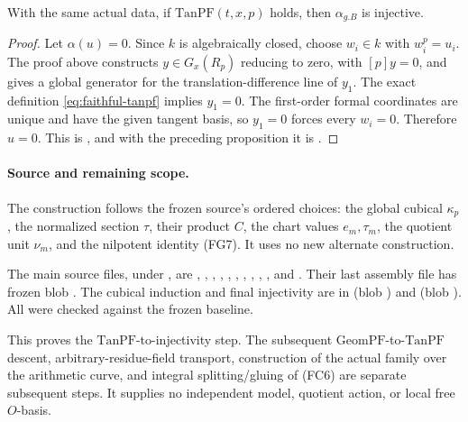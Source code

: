 \begin{srcorollary}\label{cor:faithful-tanpf-injectivity}
With the same actual data, if
\(\mathrm{TanPF}(t,x,p)\) holds, then
\(\alpha_{g.B}\) is injective.
\end{srcorollary}
\begin{proof}
Let \(\alpha(u)=0\).
Since \(k\) is algebraically closed, choose \(w_i\in k\)
with \(w_i^p=u_i\).
The proof above constructs \(y\in G_x(R_p)\) reducing to
zero, with \([p]y=0\), and gives a global generator for
the translation-difference line of \(y_1\).
The exact definition \eqref{eq:faithful-tanpf} implies
\(y_1=0\).
The first-order formal coordinates are unique and have
the given tangent basis, so \(y_1=0\) forces every \(w_i=0\).
Therefore \(u=0\).
This is , and
with the preceding proposition it is
.
\end{proof}

\paragraph{Source and remaining scope.}
The construction follows the frozen source's ordered
choices: the global cubical \(\kappa_p\), the normalized
section \(\tau\), their product \(C\), the chart values
\(e_m,\tau_m\), the quotient unit \(\nu_m\), and the
nilpotent identity (FG7).
It uses no new alternate construction.

The main source files, under
,
are ,
,
,
,
,
,
,
,
,
, and
.
Their last assembly file has frozen blob
.
The cubical induction and final injectivity are in
(blob )
and 
(blob ).
All were checked against the frozen baseline.

This proves the \(\mathrm{TanPF}\)-to-injectivity step.
The subsequent \(\mathrm{GeomPF}\)-to-\(\mathrm{TanPF}\)
descent, arbitrary-residue-field transport,
construction of the actual family over the arithmetic
curve, and integral splitting/gluing of (FC6)
are separate subsequent steps.
It supplies no independent model, quotient action,
or local free \(O\)-basis.

